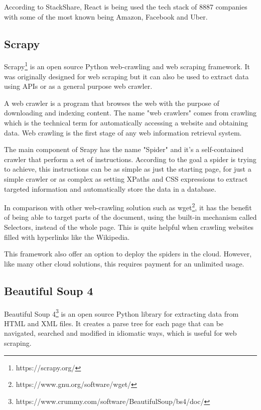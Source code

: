 According to StackShare\cite{react2020Stack}, React is being used the tech stack of 8887 companies with some of the most known being Amazon, Facebook and Uber.

\subsection{Scrapy}

Scrapy\footnote{https://scrapy.org/} is an open source Python web-crawling and web scraping framework.
It was originally designed for web scraping but it can also be used to extract data using APIs or as a general purpose web crawler.

A web crawler is a program that browses the web with the purpose of downloading and indexing content.
The name "web crawlers" comes from crawling which is the technical term for automatically accessing a website and obtaining data.
Web crawling is the first stage of any web information retrieval system\cite{saini2016information}.

The main component of Srapy has the name "Spider" and it's a self-contained crawler that perform a set of instructions.
According to the goal a spider is trying to achieve, this instructions can be as simple as just the starting page, for just a simple crawler or as complex as setting XPaths and CSS expressions to extract targeted information and automatically store the data in a database.

In comparison with other web-crawling solution such as wget\footnote{https://www.gnu.org/software/wget/}, it has the benefit of being able to target parts of the document, using the built-in mechanism called Selectors, instead of the whole page.
This is quite helpful when crawling websites filled with hyperlinks like the Wikipedia.

This framework also offer an option to deploy the spiders in the cloud.
However, like many other cloud solutions, this requires payment for an unlimited usage.

\subsection{Beautiful Soup 4}

Beautiful Soup 4\footnote{https://www.crummy.com/software/BeautifulSoup/bs4/doc/} is an open source Python library for extracting data from HTML and XML files.
It creates a parse tree for each page that can be navigated, searched and modified in idiomatic ways, which is useful for web scraping.

